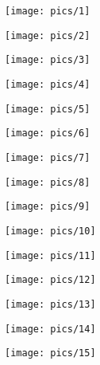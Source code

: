 \documentclass[a4paper,10pt]{article}
\begin{document}
\begin{center}
    \texttt{[image: pics/1]}
\vspace{1em}

\label{pg_BF_keys_start}

    \texttt{[image: pics/2]}
\vspace{1em}



    \texttt{[image: pics/3]}
\vspace{1em}



    \texttt{[image: pics/4]}
\vspace{1em}



    \texttt{[image: pics/5]}
\vspace{1em}



    \texttt{[image: pics/6]}
\vspace{1em}



    \texttt{[image: pics/7]}
\vspace{1em}



    \texttt{[image: pics/8]}
\vspace{1em}



    \texttt{[image: pics/9]}
\vspace{1em}



    \texttt{[image: pics/10]}
\vspace{1em}




    \texttt{[image: pics/11]}
\vspace{1em}




    \texttt{[image: pics/12]}
\vspace{1em}




    \texttt{[image: pics/13]}
\vspace{1em}




    \texttt{[image: pics/14]}
\vspace{1em}




    \texttt{[image: pics/15]}
\vspace{1em}





\end{center}
\end{document}
